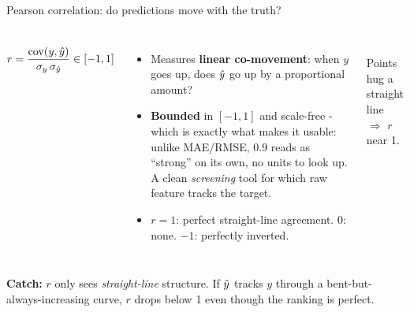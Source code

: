 \documentclass[aspectratio=169]{beamer}
\begin{document}
\begin{frame}{Pearson correlation: do predictions move with the truth?}
  \begin{columns}[T]
    \[
      r = \frac{\operatorname{cov}(y,\hat{y})}{\sigma_y\,\sigma_{\hat{y}}} \in [-1,1]
    \]
    \small
    \begin{itemize}
      \item Measures \textbf{linear co-movement}: when $y$ goes up, does $\hat{y}$ go up by a proportional amount?
      \item \textbf{Bounded} in $[-1,1]$ and scale-free - which is exactly what makes it usable: unlike MAE/RMSE, $0.9$ reads as ``strong'' on its own, no units to look up. A clean \emph{screening} tool for which raw feature tracks the target.
      \item $r = 1$: perfect straight-line agreement. $0$: none. $-1$: perfectly inverted.
    \end{itemize}
    \begin{center}
      \\[2pt]
      \scriptsize Points hug a straight line $\Rightarrow$ $r$ near 1.
    \end{center}
  \end{columns}
  \vfill
  \footnotesize \textbf{Catch:} $r$ only sees \emph{straight-line} structure. If $\hat{y}$ tracks $y$ through a bent-but-always-increasing curve, $r$ drops below 1 even though the ranking is perfect.
\end{frame}
\end{document}
